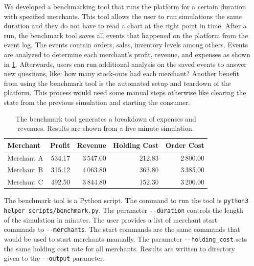 We developed a benchmarking tool that runs the \pricewars platform for a certain duration with specified merchants.
This tool allows the user to run simulations the same duration and they do not have to read a chart at the right point in time.
After a run, the benchmark tool saves all events that happened on the platform from the event log.
The events contain orders, sales, inventory levels among others.
Events are analyzed to determine each merchant's profit, revenue, and expenses as shown in \cref{tab:benchmark_tool}.
Afterwards, users can run additional analysis on the saved events to answer new questions, like: how many stock-outs had each merchant?
Another benefit from using the benchmark tool is the automated setup and teardown of the platform.
This process would need some manual steps otherwise like clearing the state from the previous simulation and starting the consumer.

\begin{table}[t]
	\centering
	\begin{tabular}{ lrrrr }
		\toprule
		\textbf{Merchant} & \textbf{Profit} & \textbf{Revenue} & \textbf{Holding Cost} & \textbf{Order Cost} \\
		\midrule
		Merchant A & 534.17 & 3\,547.00 & 212.83 & 2\,800.00 \\
		Merchant B & 315.12 & 4\,063.80 & 363.80 & 3\,385.00 \\
		Merchant C & 492.50 & 3\,844.80 & 152.30 & 3\,200.00 \\
		\bottomrule
	\end{tabular}
	\caption[Benchmark Tool: Breakdown of Expenses and Revenues]{The benchmark tool generates a breakdown of expenses and revenues. Results are shown from a five minute simulation.}
	\label{tab:benchmark_tool}
\end{table}

The benchmark tool is a Python script.
The command to run the tool is \texttt{python3 helper\_scripts/benchmark.py}.
The parameter \texttt{-{}-duration} controls the length of the simulation in minutes.
The user provides a list of merchant start commands to \texttt{-{}-merchants}.
The start commands are the same commands that would be used to start merchants manually.
The parameter \texttt{-{}-holding\_cost} sets the same holding cost rate for all merchants. 
Results are written to directory given to the \texttt{-{}-output} parameter.
